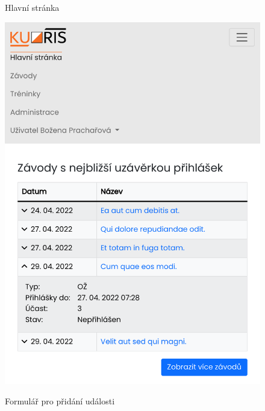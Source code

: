 \begin{figure}[h]
    \centering
    \begin{minipage}[b]{0.47\linewidth}
        \caption{Hlavní stránka}
        \label{figure:homepage-responsive-layout}
        \includegraphics[width=\linewidth]{images/homepage-responsive-layout.pdf}
    \end{minipage}
    \hfill
    \begin{minipage}[b]{0.47\linewidth}
        \caption{Formulář pro přidání události}
        \label{figure:form-responsive-layout}

\end{minipage}
\end{figure}
